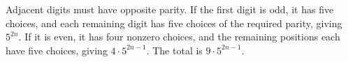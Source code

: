 Adjacent digits must have opposite parity. If the first digit is odd, it has five choices, and each remaining digit has five choices of the required parity, giving $5^{2n}$. If it is even, it has four nonzero choices, and the remaining positions each have five choices, giving $4\cdot5^{2n-1}$. The total is $\boxed{9\cdot5^{2n-1}}$.
